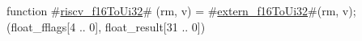 function #\hyperref[sailRISCVzriscvzyf16ToUi32]{riscv\_f16ToUi32}# (rm, v) = {
  #\hyperref[sailRISCVzexternzyf16ToUi32]{extern\_f16ToUi32}#(rm, v);
  (float_fflags[4 .. 0], float_result[31 .. 0])
}
